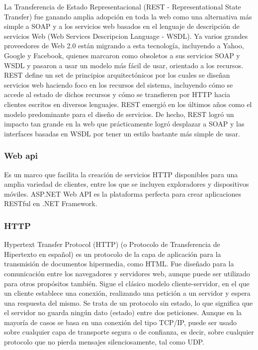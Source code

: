 		{La Transferencia de Estado Representacional (REST - Representational State Transfer) fue ganando amplia adopción en toda la web como una alternativa más simple a SOAP y a los servicios web basados en el lenguaje de descripción de servicios Web (Web Services Descripcion Language - WSDL). Ya varios grandes proveedores de Web 2.0 están migrando a esta tecnología, incluyendo a Yahoo, Google y Facebook, quienes marcaron como obsoletos a sus servicios SOAP y WSDL y pasaron a usar un modelo más fácil de usar, orientado a los recursos.\\
			
		REST define un set de principios arquitectónicos por los cuales se diseñan servicios web haciendo foco en los recursos del sistema, incluyendo cómo se accede al estado de dichos recursos y cómo se transfieren por HTTP hacia clientes escritos en diversos lenguajes. REST emergió en los últimos años como el modelo predominante para el diseño de servicios. De hecho, REST logró un impacto tan grande en la web que prácticamente logró desplazar a SOAP y las interfaces basadas en WSDL por tener un estilo bastante más simple de usar.}
	
	
		\subsubsection{Web api}
		
		{Es un marco que facilita la creación de servicios HTTP disponibles para una amplia variedad de clientes, entre los que se incluyen exploradores y dispositivos móviles. ASP.NET Web API es la plataforma perfecta para crear aplicaciones RESTful en .NET Framework.}
		
		
		\subsubsection{HTTP}
		
		{Hypertext Transfer Protocol (HTTP) (o Protocolo de Transferencia de Hipertexto en español) es un protocolo de la capa de aplicación para la transmisión de documentos hipermedia, como HTML. Fue diseñado para la comunicación entre los navegadores y servidores web, aunque puede ser utilizado para otros propósitos también. Sigue el clásico modelo cliente-servidor, en el que un cliente establece una conexión, realizando una petición a un servidor y espera una respuesta del mismo. Se trata de un protocolo sin estado, lo que significa que el servidor no guarda ningún dato (estado) entre dos peticiones. Aunque en la mayoría de casos se basa en una conexión del tipo TCP/IP, puede ser usado sobre cualquier capa de transporte segura o de confianza, es decir, sobre cualquier protocolo que no pierda mensajes silenciosamente, tal como UDP.}
		

